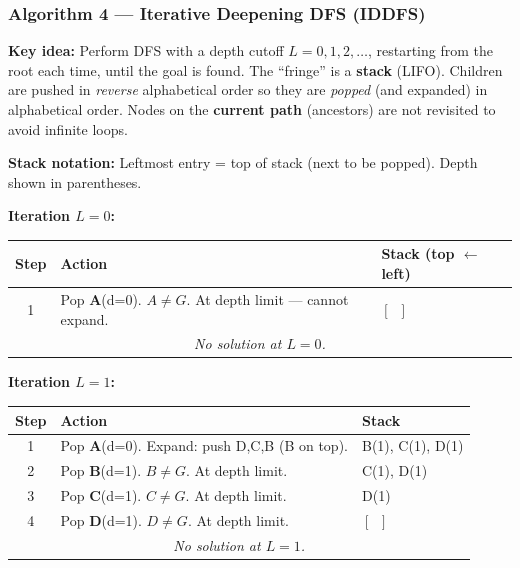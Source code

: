 \documentclass[12pt, a4paper]{article}
\begin{document}
\vspace{1em}

\subsubsection*{Algorithm 4 — Iterative Deepening DFS (IDDFS)}

\textbf{Key idea:} Perform DFS with a depth cutoff $L = 0, 1, 2, \ldots$, restarting from the root each time, until the goal is found. The ``fringe'' is a \textbf{stack} (LIFO). Children are pushed in \emph{reverse} alphabetical order so they are \emph{popped} (and expanded) in alphabetical order. Nodes on the \textbf{current path} (ancestors) are not revisited to avoid infinite loops.

\textbf{Stack notation:} Leftmost entry = top of stack (next to be popped). Depth shown in parentheses.

\vspace{0.5em}

\noindent\textbf{Iteration $L = 0$:}
\begin{center}
\renewcommand{\arraystretch}{1.2}
\begin{tabular}{c|l|p{8cm}}
\toprule
\textbf{Step} & \textbf{Action} & \textbf{Stack (top $\leftarrow$ left)} \\
\midrule
1 & Pop \textbf{A}(d=0). $A \neq G$. At depth limit — cannot expand. & $[\;\;]$ \\
\midrule
\multicolumn{3}{c}{\textit{No solution at $L=0$.}} \\
\bottomrule
\end{tabular}
\end{center}

\vspace{0.6em}

\noindent\textbf{Iteration $L = 1$:}
\begin{center}
\renewcommand{\arraystretch}{1.2}
\begin{tabular}{c|l|p{8cm}}
\toprule
\textbf{Step} & \textbf{Action} & \textbf{Stack} \\
\midrule
1 & Pop \textbf{A}(d=0). Expand: push D,C,B (B on top). & B(1), C(1), D(1) \\
2 & Pop \textbf{B}(d=1). $B \neq G$. At depth limit. & C(1), D(1) \\
3 & Pop \textbf{C}(d=1). $C \neq G$. At depth limit. & D(1) \\
4 & Pop \textbf{D}(d=1). $D \neq G$. At depth limit. & $[\;\;]$ \\
\midrule
\multicolumn{3}{c}{\textit{No solution at $L=1$.}} \\
\bottomrule
\end{tabular}
\end{center}
\end{document}

